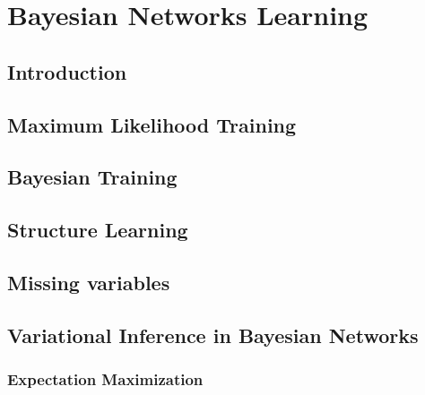 \documentclass[twoside,openright,titlepage,numbers=noenddot,openany,headinclude,footinclude=true, cleardoublepage=empty,abstractoff,BCOR=5mm,paper=a4,fontsize=11pt, dvipsnames]{scrreprt}
\begin{document}



\ctparttext{
  \color{black}
  \begin{center}

  \end{center}
}
\part{Bayesian Networks Learning}

\chapter{Introduction}



\chapter{Maximum Likelihood Training}



\chapter{Bayesian Training}



\chapter{Structure Learning}



\chapter{Missing variables}



\chapter{Variational Inference in Bayesian Networks}



\section{Expectation Maximization}\label{sec:em}
\end{document}
